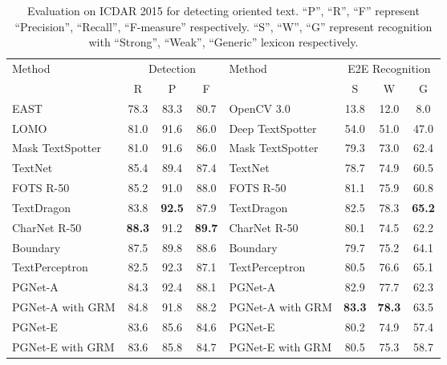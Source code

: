\documentclass[letterpaper]{article} \usepackage{aaai21}  \usepackage{times}  \usepackage{helvet} \usepackage{courier}  \usepackage[hyphens]{url}  \usepackage{graphicx} \urlstyle{rm} \def\UrlFont{\rm}  \usepackage{natbib}  \usepackage{caption} \usepackage{bm}
\begin{document}
\begin{table*}
    \centering
	  \begin{tabular}{l|c|c|c|l|c|c|c}
	  \hline
		\multirow{2}{*}{Method} & \multicolumn{3}{c|}{Detection} & \multirow{2}{*}{Method} & \multicolumn{3}{c}{E2E Recognition} \\
		\cline{2-4} \cline{6-8} & R & P & F & & S & W & G  \\
 		\hline
EAST~\cite{zhou2017east}                & 78.3 &83.3 &80.7 & OpenCV 3.0~\cite{karatzas2015icdar}   &13.8 &12.0 &8.0 \\
        LOMO~\cite{Zhang2019CVPR}               & 81.0 &91.6 &86.0 & Deep TextSpotter~\cite{busta2017deep}         &54.0 &51.0 &47.0 \\
        Mask TextSpotter~\cite{yao2018mask}     & 81.0 &91.6 &86.0 & Mask TextSpotter~\cite{yao2018mask}            &79.3 &73.0 &62.4 \\
        TextNet~\cite{sun2018textnet}           & 85.4 &89.4 &87.4 & TextNet~\cite{sun2018textnet}                  &78.7 &74.9 &60.5 \\
        FOTS R-50~\cite{liu2018fots}            & 85.2 &91.0 &88.0 & FOTS R-50~\cite{liu2018fots}                   &81.1 &75.9 &60.8 \\
        TextDragon~\cite{feng2019textdragon}    &83.8  &\textbf{92.5} &87.9 & TextDragon~\cite{feng2019textdragon}           &82.5 &78.3 &\textbf{65.2} \\
        CharNet R-50~\cite{xing2019convolutional} &\textbf{88.3} &91.2 &\textbf{89.7} & CharNet R-50~\cite{xing2019convolutional}    &80.1 &74.5 &62.2 \\
        Boundary~\cite{wang2020all}           & 87.5 &89.8 &88.6 & Boundary~\cite{wang2020all}                    &79.7 &75.2 &64.1 \\
        TextPerceptron~\cite{cheng21text}  & 82.5 &92.3 &87.1 & TextPerceptron~\cite{cheng21text}  &80.5 &76.6 &65.1 \\
        \hline
        PGNet-A             & 84.3 & 92.4 & 88.1 & PGNet-A & 82.9 & 77.7 & 62.3 \\
        PGNet-A with GRM    & 84.8 & 91.8 & 88.2 & PGNet-A with GRM &\textbf{83.3} &\textbf{78.3} & 63.5 \\
        PGNet-E             & 83.6 & 85.6 & 84.6 & PGNet-E & 80.2 & 74.9 & 57.4 \\
        PGNet-E with GRM    & 83.6 & 85.8 & 84.7 & PGNet-E with GRM & 80.5 & 75.3 & 58.7 \\
		\hline
	\end{tabular}
	\caption{Evaluation on ICDAR 2015 for detecting oriented text. ``P'', ``R'', ``F'' represent ``Precision'', ``Recall'', ``F-measure'' respectively. ``S'', ``W'', ``G'' represent recognition with ``Strong'', ``Weak'', ``Generic'' lexicon respectively.}
	\label{tab:ex_ic15}
\end{table*} 
\end{document}
